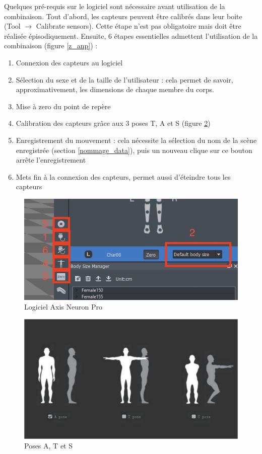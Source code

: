 \documentclass{article}
\begin{document}
Quelques pré-requis sur le logiciel sont nécessaire avant utilisation de la combinaison. Tout d'abord, les capteurs peuvent être calibrés dans leur boite (Tool $\longrightarrow$ Calibrate sensors). Cette étape n'est pas obligatoire mais doit être réalisée épisodiquement. Ensuite, 6 étapes essentielles admettent l'utilisation de la combinaison (figure \ref{z_anp}) :
\begin{enumerate}
	\item Connexion des capteurs au logiciel
	\item Sélection du sexe et de la taille de l'utilisateur : cela permet de savoir, approximativement, les dimensions de chaque membre du corps.
	\item Mise à zero du point de repère
	\item Calibration des capteurs grâce aux 3 poses T, A et S (figure \ref{poses})
	\item Enregistrement du mouvement : cela nécessite la sélection du nom de la scène enregistrée (section \ref{nommage_data}), puis un nouveau clique sur ce bouton arrête l'enregistrement
	\item Mets fin à la connexion des capteurs, permet aussi d'éteindre tous les capteurs
\end{enumerate}

\begin{figure}
	\centering
	\includegraphics[scale=0.4]{img/zoom_anp.png}
	\caption{Logiciel Axis Neuron Pro}
	\label{a_n_p}
\end{figure}

\begin{figure}
	\centering
	\includegraphics[scale=0.4]{img/poses.png}
	\caption{Poses A, T et S}
	\label{poses}
\end{figure}
\end{document}
